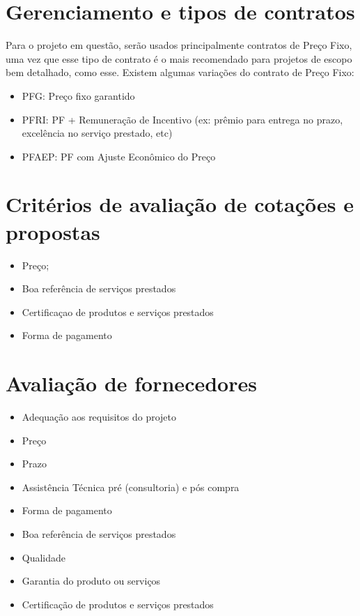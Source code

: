 \documentclass[12pt,openright,oneside,a4paper,brazil]{abntex2}
\begin{document}
   
\section{Gerenciamento e tipos de contratos}
Para o projeto em questão, serão usados principalmente contratos de Preço Fixo, uma vez que esse tipo de contrato é o mais recomendado para projetos de escopo bem detalhado, como esse. 
Existem algumas variações do contrato de Preço Fixo:
\begin{itemize}

\item PFG: Preço fixo garantido
\item PFRI: PF + Remuneração de Incentivo (ex: prêmio para entrega no prazo, excelência no serviço prestado, etc)
\item PFAEP: PF com Ajuste Econômico do Preço
\end{itemize}

\section{Critérios de avaliação de cotações e propostas}
\begin{itemize}
\item Preço;
\item Boa referência de serviços prestados
\item Certificaçao de produtos e serviços prestados
\item Forma de pagamento
\end{itemize}

\section{Avaliação de fornecedores}
\begin{itemize}
\item Adequação aos requisitos do projeto
\item Preço
\item Prazo
\item Assistência Técnica pré (consultoria) e pós compra
\item Forma de pagamento
\item Boa referência de serviços prestados
\item Qualidade
\item Garantia do produto ou serviços
\item Certificação de produtos e serviços prestados
\end{itemize}
\end{document}
